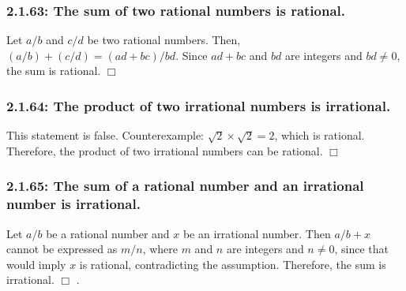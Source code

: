 \documentclass[12pt]{article}
\begin{document}
\subsubsection*{2.1.63: The sum of two rational numbers is rational.}
Let \(a/b\) and \(c/d\) be two rational numbers. Then, \((a/b) + (c/d) = (ad+bc) / bd\). Since \(ad+bc\) and \(bd\) are integers and \(bd \neq 0\), the sum is rational. \(\Box\)

\subsubsection*{2.1.64: The product of two irrational numbers is irrational.}
This statement is false. Counterexample: \(\sqrt{2} \times \sqrt{2} = 2\), which is rational. Therefore, the product of two irrational numbers can be rational. \(\Box\)

\subsubsection*{2.1.65: The sum of a rational number and an irrational number is irrational.}
Let \(a/b\) be a rational number and \(x\) be an irrational number. Then \(a/b + x\) cannot be expressed as \(m/n\), where \(m\) and \(n\) are integers and \(n \neq 0\), since that would imply \(x\) is rational, contradicting the assumption. Therefore, the sum is irrational. \(\Box\)
.
\end{document}

